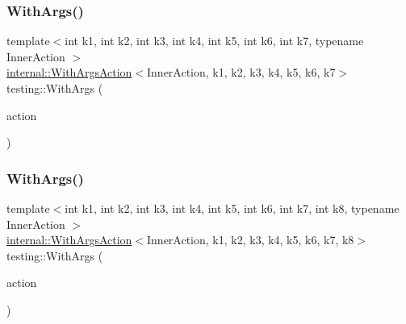 \mbox{\label{namespacetesting_a04146a27847141c6942e9c67a85aadbe}} 
\subsubsection{\texorpdfstring{With\+Args()}{WithArgs()}\hspace{0.1cm}{\footnotesize\ttfamily [7/10]}}
{\footnotesize\ttfamily template$<$int k1, int k2, int k3, int k4, int k5, int k6, int k7, typename Inner\+Action $>$ \\
\hyperlink{classtesting_1_1internal_1_1_with_args_action}{internal\+::\+With\+Args\+Action}$<$Inner\+Action, k1, k2, k3, k4, k5, k6, k7$>$ testing\+::\+With\+Args (\begin{DoxyParamCaption}\item[{const Inner\+Action \&}]{action }\end{DoxyParamCaption})\hspace{0.3cm}{\ttfamily [inline]}}

\mbox{\label{namespacetesting_a16c131c0d58ae07d2e1ee6c7a44aaad1}} 
\subsubsection{\texorpdfstring{With\+Args()}{WithArgs()}\hspace{0.1cm}{\footnotesize\ttfamily [8/10]}}
{\footnotesize\ttfamily template$<$int k1, int k2, int k3, int k4, int k5, int k6, int k7, int k8, typename Inner\+Action $>$ \\
\hyperlink{classtesting_1_1internal_1_1_with_args_action}{internal\+::\+With\+Args\+Action}$<$Inner\+Action, k1, k2, k3, k4, k5, k6, k7, k8$>$ testing\+::\+With\+Args (\begin{DoxyParamCaption}\item[{const Inner\+Action \&}]{action }\end{DoxyParamCaption})\hspace{0.3cm}{\ttfamily [inline]}}

\mbox{\label{namespacetesting_a6aec78e6c201b150c78271e3f851414e}} 
